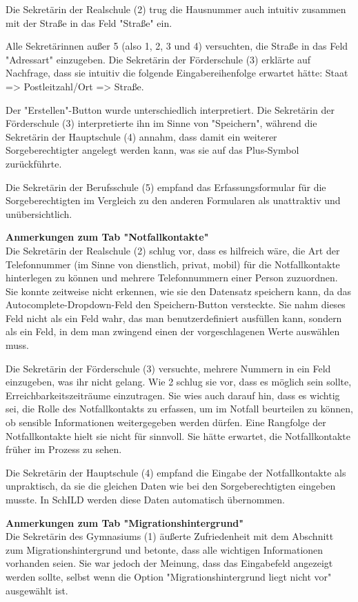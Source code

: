 Die Sekretärin der Realschule (2) trug die Hausnummer auch intuitiv zusammen mit der Straße in das Feld "Straße" ein.

Alle Sekretärinnen außer 5 (also 1, 2, 3 und 4) versuchten, die Straße in das Feld "Adressart" einzugeben. Die Sekretärin der Förderschule (3) erklärte auf Nachfrage, dass sie intuitiv die folgende Eingabereihenfolge erwartet hätte: Staat => Postleitzahl/Ort => Straße.

Der "Erstellen"-Button wurde unterschiedlich interpretiert. Die Sekretärin der Förderschule (3) interpretierte ihn im Sinne von "Speichern", während die Sekretärin der Hauptschule (4) annahm, dass damit ein weiterer Sorgeberechtigter angelegt werden kann, was sie auf das Plus-Symbol zurückführte.

Die Sekretärin der Berufsschule (5) empfand das Erfassungsformular für die Sorgeberechtigten im Vergleich zu den anderen Formularen als unattraktiv und unübersichtlich.

\textbf{Anmerkungen zum Tab "Notfallkontakte"}\\
Die Sekretärin der Realschule (2) schlug vor, dass es hilfreich wäre, die Art der Telefonnummer (im Sinne von dienstlich, privat, mobil) für die Notfallkontakte hinterlegen zu können und mehrere Telefonnummern einer Person zuzuordnen. Sie konnte zeitweise nicht erkennen, wie sie den Datensatz speichern kann, da das Autocomplete-Dropdown-Feld den Speichern-Button versteckte. Sie nahm dieses Feld nicht als ein Feld wahr, das man benutzerdefiniert ausfüllen kann, sondern als ein Feld, in dem man zwingend einen der vorgeschlagenen Werte auswählen muss.

Die Sekretärin der Förderschule (3) versuchte, mehrere Nummern in ein Feld einzugeben, was ihr nicht gelang. Wie 2 schlug sie vor, dass es möglich sein sollte, Erreichbarkeitszeiträume einzutragen. Sie wies auch darauf hin, dass es wichtig sei, die Rolle des Notfallkontakts zu erfassen, um im Notfall beurteilen zu können, ob sensible Informationen weitergegeben werden dürfen. Eine Rangfolge der Notfallkontakte hielt sie nicht für sinnvoll. Sie hätte erwartet, die Notfallkontakte früher im Prozess zu sehen.

Die Sekretärin der Hauptschule (4) empfand die Eingabe der Notfallkontakte als unpraktisch, da sie die gleichen Daten wie bei den Sorgeberechtigten eingeben musste. In SchILD werden diese Daten automatisch übernommen.

\textbf{Anmerkungen zum Tab "Migrationshintergrund"}\\
Die Sekretärin des Gymnasiums (1) äußerte Zufriedenheit mit dem Abschnitt zum Migrationshintergrund und betonte, dass alle wichtigen Informationen vorhanden seien. Sie war jedoch der Meinung, dass das Eingabefeld angezeigt werden sollte, selbst wenn die Option "Migrationshintergrund liegt nicht vor" ausgewählt ist.


